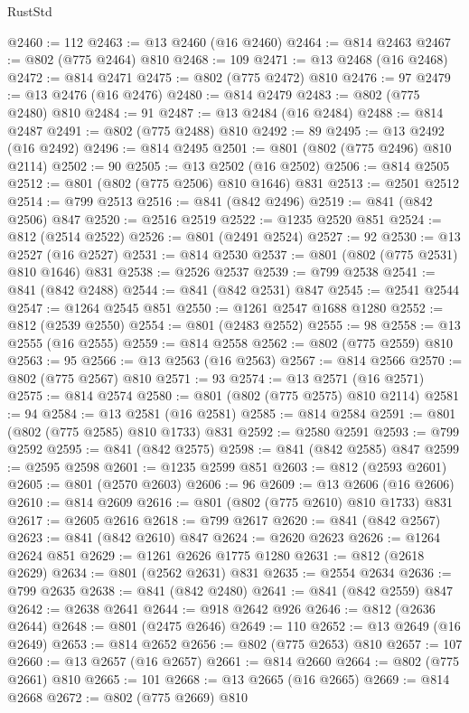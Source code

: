 \begin{lexlean}{RustStd}
\begin{coremodule}
{\begin{coremodule}
{{{{{@2460 := 112
@2463 := @13 @2460 (@16 @2460)
@2464 := @814 @2463
@2467 := @802 (@775 @2464) @810
@2468 := 109
@2471 := @13 @2468 (@16 @2468)
@2472 := @814 @2471
@2475 := @802 (@775 @2472) @810
@2476 := 97
@2479 := @13 @2476 (@16 @2476)
@2480 := @814 @2479
@2483 := @802 (@775 @2480) @810
@2484 := 91
@2487 := @13 @2484 (@16 @2484)
@2488 := @814 @2487
@2491 := @802 (@775 @2488) @810
@2492 := 89
@2495 := @13 @2492 (@16 @2492)
@2496 := @814 @2495
@2501 := @801 (@802 (@775 @2496) @810 @2114)
@2502 := 90
@2505 := @13 @2502 (@16 @2502)
@2506 := @814 @2505
@2512 := @801 (@802 (@775 @2506) @810 @1646) @831
@2513 := @2501 @2512
@2514 := @799 @2513
@2516 := @841 (@842 @2496)
@2519 := @841 (@842 @2506) @847
@2520 := @2516 @2519
@2522 := @1235 @2520 @851
@2524 := @812 (@2514 @2522)
@2526 := @801 (@2491 @2524)
@2527 := 92
@2530 := @13 @2527 (@16 @2527)
@2531 := @814 @2530
@2537 := @801 (@802 (@775 @2531) @810 @1646) @831
@2538 := @2526 @2537
@2539 := @799 @2538
@2541 := @841 (@842 @2488)
@2544 := @841 (@842 @2531) @847
@2545 := @2541 @2544
@2547 := @1264 @2545 @851
@2550 := @1261 @2547 @1688 @1280
@2552 := @812 (@2539 @2550)
@2554 := @801 (@2483 @2552)
@2555 := 98
@2558 := @13 @2555 (@16 @2555)
@2559 := @814 @2558
@2562 := @802 (@775 @2559) @810
@2563 := 95
@2566 := @13 @2563 (@16 @2563)
@2567 := @814 @2566
@2570 := @802 (@775 @2567) @810
@2571 := 93
@2574 := @13 @2571 (@16 @2571)
@2575 := @814 @2574
@2580 := @801 (@802 (@775 @2575) @810 @2114)
@2581 := 94
@2584 := @13 @2581 (@16 @2581)
@2585 := @814 @2584
@2591 := @801 (@802 (@775 @2585) @810 @1733) @831
@2592 := @2580 @2591
@2593 := @799 @2592
@2595 := @841 (@842 @2575)
@2598 := @841 (@842 @2585) @847
@2599 := @2595 @2598
@2601 := @1235 @2599 @851
@2603 := @812 (@2593 @2601)
@2605 := @801 (@2570 @2603)
@2606 := 96
@2609 := @13 @2606 (@16 @2606)
@2610 := @814 @2609
@2616 := @801 (@802 (@775 @2610) @810 @1733) @831
@2617 := @2605 @2616
@2618 := @799 @2617
@2620 := @841 (@842 @2567)
@2623 := @841 (@842 @2610) @847
@2624 := @2620 @2623
@2626 := @1264 @2624 @851
@2629 := @1261 @2626 @1775 @1280
@2631 := @812 (@2618 @2629)
@2634 := @801 (@2562 @2631) @831
@2635 := @2554 @2634
@2636 := @799 @2635
@2638 := @841 (@842 @2480)
@2641 := @841 (@842 @2559) @847
@2642 := @2638 @2641
@2644 := @918 @2642 @926
@2646 := @812 (@2636 @2644)
@2648 := @801 (@2475 @2646)
@2649 := 110
@2652 := @13 @2649 (@16 @2649)
@2653 := @814 @2652
@2656 := @802 (@775 @2653) @810
@2657 := 107
@2660 := @13 @2657 (@16 @2657)
@2661 := @814 @2660
@2664 := @802 (@775 @2661) @810
@2665 := 101
@2668 := @13 @2665 (@16 @2665)
@2669 := @814 @2668
@2672 := @802 (@775 @2669) @810
}}}}}
\end{coremodule}}
\end{coremodule}
\end{lexlean}
